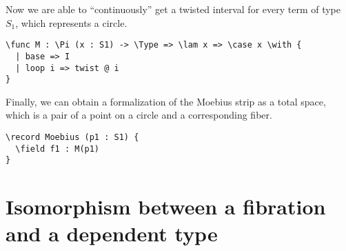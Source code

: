 Now we are able to ``continuously'' get a twisted interval for every term of type $S_1$, which represents a circle.

\begin{ListingEnv}[H]
\begin{lstlisting}
\func M : \Pi (x : S1) -> \Type => \lam x => \case x \with {
  | base => I
  | loop i => twist @ i
}
\end{lstlisting}
\end{ListingEnv}

Finally, we can obtain a formalization of the Moebius strip as a total space, which is a pair of a point on a circle and a corresponding fiber.

\begin{ListingEnv}[H]
\begin{lstlisting}
\record Moebius (p1 : S1) {
  \field f1 : M(p1)
}
\end{lstlisting}
\end{ListingEnv}

\section{Isomorphism between a fibration and a dependent type}

